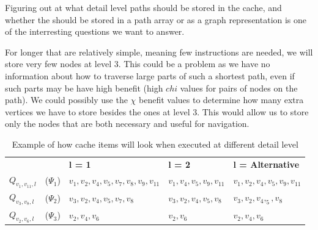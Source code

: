 Figuring out at what detail level paths should be stored in the cache, and whether the should be stored in a path array or as a graph representation is one of the interresting questions we want to answer. 

For longer \spaths that are relatively simple, meaning few instructions are needed, we will store very few nodes at level 3. This could be a problem as we have no information about how to traverse large parts of such a shortest path, even if such parts may be have high benefit (high $chi$ values for pairs of nodes on the path). We could possibly use the $\chi$ benefit values to determine how many extra vertices we have to store besides the ones at level 3. This would allow us to store only the nodes that are both necessary and useful for navigation.


\begin{table}
\begin{tabular}{@{}l@{}l@{}|@{}l@{}|@{}l@{}|@{}l@{}|@{}}\cline{3-5}
			&		& \bf l = 1				& \bf l = 2 			& \bf l = Alternative\\\cline{3-5}
$Q_{v_1,v_{11},l}$	& ($\Psi_1$)	& $v_1,v_2,v_4,v_5,v_7,v_8,v_9,v_{11}$ 	& $v_1,v_4,v_5,v_9,v_{11}$ 	& $v_1,v_2,v_4,v_5,v_9,v_{11}$\\\cline{3-5}
$Q_{v_3,v_8,l}$		& ($\Psi_2$)	& $v_3,v_2,v_4,v_5,v_7,v_8$		& $v_3,v_2,v_4,v_5,v_8$ 	& $v_3,v_2,v_4,_5,v_8$\\\cline{3-5}
$Q_{v_2,v_6,l}$		& ($\Psi_3$)	& $v_2,v_4,v_6$				& $v_2,v_6$			& $v_2,v_4,v_6$\\\cline{3-5}
\end{tabular}
  \caption{Example of how cache items will look when executed at different detail level}
  \label{tab:psilvlcontent}
\end{table}

